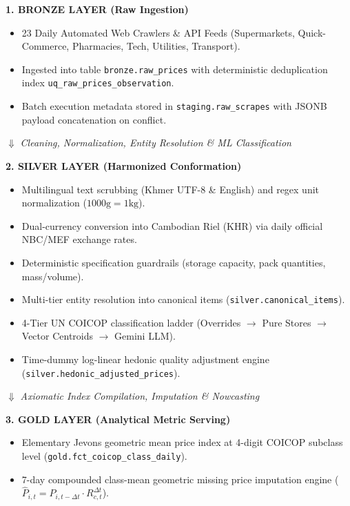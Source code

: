 \documentclass[11pt,a4paper,oneside]{article}
\begin{document}
\begin{center}
\begin{tcolorbox}[colback=white,colframe=NavyBlue,width=\textwidth,title=\bfseries Medallion Data Platform Flow]
\small
\textbf{1. BRONZE LAYER (Raw Ingestion)}
\begin{itemize}[noitemsep]
    \item 23 Daily Automated Web Crawlers \& API Feeds (Supermarkets, Quick-Commerce, Pharmacies, Tech, Utilities, Transport).
    \item Ingested into table \texttt{bronze.raw\_prices} with deterministic deduplication index \texttt{uq\_raw\_prices\_observation}.
    \item Batch execution metadata stored in \texttt{staging.raw\_scrapes} with JSONB payload concatenation on conflict.
\end{itemize}
\centering $\Downarrow$ \textit{Cleaning, Normalization, Entity Resolution \& ML Classification} \\
\raggedright
\textbf{2. SILVER LAYER (Harmonized Conformation)}
\begin{itemize}[noitemsep]
    \item Multilingual text scrubbing (Khmer UTF-8 \& English) and regex unit normalization ($1000\text{g} = 1\text{kg}$).
    \item Dual-currency conversion into Cambodian Riel (KHR) via daily official NBC/MEF exchange rates.
    \item Deterministic specification guardrails (storage capacity, pack quantities, mass/volume).
    \item Multi-tier entity resolution into canonical items (\texttt{silver.canonical\_items}).
    \item 4-Tier UN COICOP classification ladder (Overrides $\rightarrow$ Pure Stores $\rightarrow$ Vector Centroids $\rightarrow$ Gemini LLM).
    \item Time-dummy log-linear hedonic quality adjustment engine (\texttt{silver.hedonic\_adjusted\_prices}).
\end{itemize}
\centering $\Downarrow$ \textit{Axiomatic Index Compilation, Imputation \& Nowcasting} \\
\raggedright
\textbf{3. GOLD LAYER (Analytical Metric Serving)}
\begin{itemize}[noitemsep]
    \item Elementary Jevons geometric mean price index at 4-digit COICOP subclass level (\texttt{gold.fct\_coicop\_class\_daily}).
    \item 7-day compounded class-mean geometric missing price imputation engine ($\widehat{P}_{i,t} = P_{i,t-\Delta t} \cdot R_{c,t}^{\Delta t}$).

\end{itemize}
\end{tcolorbox}
\end{center}
\end{document}
